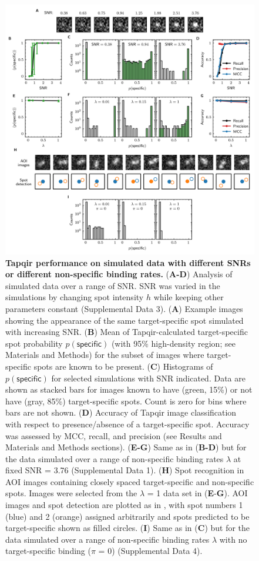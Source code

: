 \begin{figure}
\begin{fullwidth}
\includegraphics[width=183mm]{figures/tapqir_performance.png}
\caption{\textbf{Tapqir performance on simulated data with different SNRs or different non-specific binding rates.} (\textbf{A-D}) Analysis of simulated data over a range of SNR. SNR was varied in the simulations by changing spot intensity  $h$ while keeping other parameters constant (Supplemental Data 3). (\textbf{A}) Example images showing the appearance of the same target-specific spot simulated with increasing SNR.   (\textbf{B}) Mean of Tapqir-calculated target-specific spot probability $p(\mathsf{specific})$ (with 95\% high-density region; see Materials and Methods) for the subset of images where target-specific spots  are known to be present. (\textbf{C}) Histograms of $p(\mathsf{specific})$ for selected simulations with SNR indicated. Data are shown as stacked bars for images known to have (green, 15\%) or not have (gray, 85\%) target-specific spots.  Count is zero for bins where bars are not shown. (\textbf{D}) Accuracy of Tapqir image classification with respect to presence/absence of a target-specific spot. Accuracy was assessed by MCC, recall, and precision (see Results and Materials and Methods sections). (\textbf{E-G}) Same as in (\textbf{B-D}) but for the data simulated over a range of non-specific binding rates $\lambda$ at fixed SNR = 3.76 (Supplemental Data 1). (\textbf{H}) Spot recognition in AOI images containing closely spaced target-specific and non-specific spots.  Images were selected from the $\lambda$ = 1 data set in (\textbf{E}-\textbf{G}). AOI images and spot detection are plotted as in , with spot numbers 1 (blue) and 2 (orange) assigned arbitrarily and spots predicted to be target-specific shown as filled circles. (\textbf{I}) Same as in (\textbf{C}) but for the data simulated over a range of non-specific binding rates $\lambda$ with no target-specific binding ($\pi$ = 0) (Supplemental Data 4).}

\end{fullwidth}
\end{figure}
